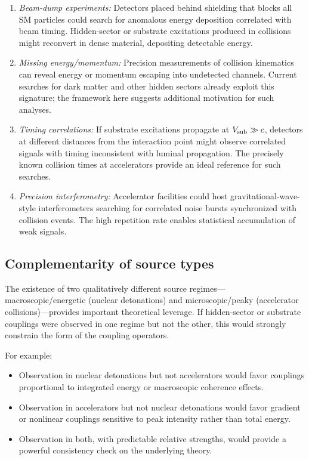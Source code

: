 \documentclass[aps,prd,twocolumn,nofootinbib,superscriptaddress]{revtex4-2}
\begin{document}
\begin{enumerate}
    \item \textit{Beam-dump experiments:} Detectors placed behind shielding that blocks all SM particles could search for anomalous energy deposition correlated with beam timing. Hidden-sector or substrate excitations produced in collisions might reconvert in dense material, depositing detectable energy.

    \item \textit{Missing energy/momentum:} Precision measurements of collision kinematics can reveal energy or momentum escaping into undetected channels. Current searches for dark matter and other hidden sectors already exploit this signature; the framework here suggests additional motivation for such analyses.

    \item \textit{Timing correlations:} If substrate excitations propagate at $V_{\rm sub} \gg c$, detectors at different distances from the interaction point might observe correlated signals with timing inconsistent with luminal propagation. The precisely known collision times at accelerators provide an ideal reference for such searches.

    \item \textit{Precision interferometry:} Accelerator facilities could host gravitational-wave-style interferometers searching for correlated noise bursts synchronized with collision events. The high repetition rate enables statistical accumulation of weak signals.
\end{enumerate}

\subsection{Complementarity of source types}

The existence of two qualitatively different source regimes---macroscopic/energetic (nuclear detonations) and microscopic/peaky (accelerator collisions)---provides important theoretical leverage. If hidden-sector or substrate couplings were observed in one regime but not the other, this would strongly constrain the form of the coupling operators.

For example:
\begin{itemize}
    \item Observation in nuclear detonations but not accelerators would favor couplings proportional to integrated energy or macroscopic coherence effects.
    \item Observation in accelerators but not nuclear detonations would favor gradient or nonlinear couplings sensitive to peak intensity rather than total energy.
    \item Observation in both, with predictable relative strengths, would provide a powerful consistency check on the underlying theory.
\end{itemize}
\end{document}

